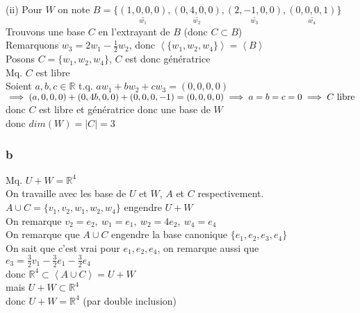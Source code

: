 \documentclass[11pt]{exam}
\newcommand{\R}{\mathbb{R}}
\newcommand{\0}{\mathbb{0}}
\begin{document}
(ii) Pour $W$ on note $B = \{\underset{w_1}{\underline{(1,0,0,0)}},\underset{w_2}{\underline{(0,4,0,0)}},\underset{w_3}{\underline{(2,-1,0,0)}},\underset{w_4}{\underline{(0,0,0,1)}}\}$\\
Trouvons une base $C$ en l'extrayant de $B$ (donc $C \subset B$)\\
Remarquons $w_3 = 2w_1-\frac{1}{2}w_2$, donc $\left<\{w_1, w_2, w_4\}\right> = \left<B\right>$\\
Posons $C = \{w_1, w_2, w_4\}$, $C$ est donc génératrice\\
Mq. $C$ est libre\\
Soient $a,b,c \in \R$ t.q. $aw_1 + bw_2 + cw_3 = (0,0,0,0)$\\
$\implies (a,0,0,0) + (0,4b,0,0) + (0,0,0,-1) = (0,0,0,0)\\\implies a = b = c = 0 \implies C\ \text{libre}$\\
donc $C$ est libre et génératrice donc une base de $W$\\
donc $dim(W) = |C| = 3$

\subsubsection*{b}
Mq. $U+W = \R^4$\\
On travaille avec les base de $U$ et $W$, $A$ et $C$ respectivement.\\
$A\cup C = \{v_1,v_2,w_1,w_2,w_4\}$ engendre $U+W$\\
On remarque $v_2 = e_2,\ w_1 = e_1,\ w_2 = 4e_2,\ w_4 = e_4$\\
On remarque que $A\cup C$ engendre la base canonique $\{e_1,e_2,e_3,e_4\}$\\
On sait que c'est vrai pour $e_1,e_2,e_4$, on remarque aussi que\\
$e_3 = \frac{3}{2}v_1-\frac{3}{2}e_1-\frac{3}{2}e_4$\\
donc $\R^4 \subset \left<A\cup C\right> = U+W$\\
mais $U+W \subset \R^4$\\
donc $U+W = \R^4$ (par double inclusion)
\end{document}
